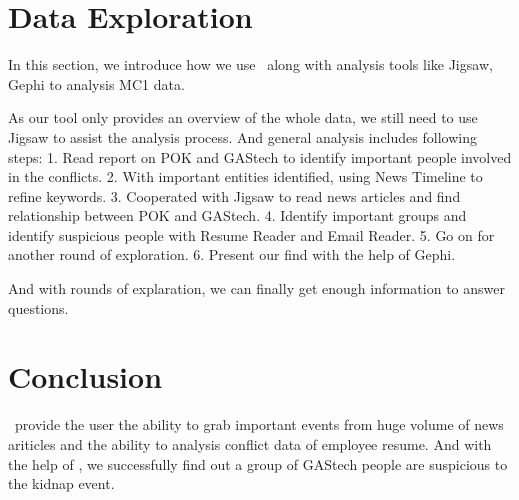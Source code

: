 \documentclass{vgtc}                          %
\begin{document}
\section{Data Exploration}
In this section, we introduce how we use \projectname\ along with analysis tools like Jigsaw, Gephi to analysis MC1 data.
\par
As our tool only provides an overview of the whole data, we still need to use Jigsaw to assist the analysis process. And general analysis includes following steps:
1. Read report on POK and GAStech to identify important people involved in the conflicts.
2. With important entities identified, using News Timeline to refine keywords.
3. Cooperated with Jigsaw to read news articles and find relationship between POK and GAStech.
4. Identify important groups and identify suspicious people with Resume Reader and Email Reader.
5. Go on for another round of exploration.
6. Present our find with the help of Gephi.
\par
And with rounds of explaration, we can finally get enough information to answer questions.

\section{Conclusion}
\projectname\ provide the user the ability to grab important events from huge volume of news ariticles and the ability to analysis conflict data of employee resume. And with the help of \projectname, we successfully find out a group of GAStech people are suspicious to the kidnap event. 




\end{document}
